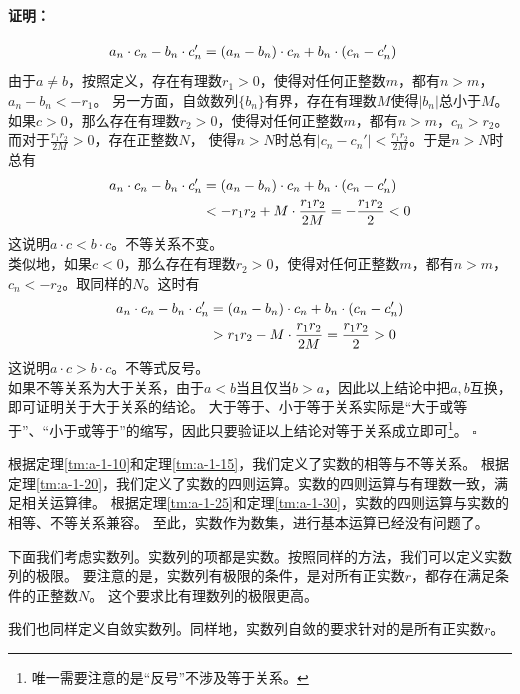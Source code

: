 \documentclass[12pt,UTF8]{ctexbook}
\renewenvironment{proof}{\paragraph{\textbf{证明：}}}{\hfill$\square$}
\begin{document}
\begin{appendix}
\begin{proof}
    \begin{align}
        a_n\cdot c_n - b_n\cdot c_n' &= (a_n - b_n)\cdot c_n + b_n\cdot(c_n - c_n') \notag 
    \end{align}
    由于$a\neq b$，按照定义，存在有理数$r_1>0$，使得对任何正整数$m$，都有$n>m$，$a_n - b_n < -r_1$。
    另一方面，自敛数列$\{b_n\}$有界，存在有理数$M$使得$|b_n|$总小于$M$。\\
    如果$c > 0$，那么存在有理数$r_2>0$，使得对任何正整数$m$，都有$n>m$，$c_n > r_2$。
    而对于$\frac{r_1r_2}{2M}>0$，存在正整数$N$，
    使得$n>N$时总有$|c_n - c_n'| < \frac{r_1r_2}{2M}$。于是$n>N$时总有
    \begin{align}
        a_n\cdot c_n - b_n\cdot c_n' &= (a_n - b_n)\cdot c_n + b_n\cdot(c_n - c_n') \notag \\
        &< -r_1r_2 + M\cdot\frac{r_1r_2}{2M} = -\frac{r_1r_2}{2} < 0 \notag
    \end{align}
    这说明$a\cdot c < b\cdot c$。不等关系不变。\\
    类似地，如果$c < 0$，那么存在有理数$r_2>0$，使得对任何正整数$m$，都有$n>m$，$c_n < -r_2$。取同样的$N$。这时有
    \begin{align}
        a_n\cdot c_n - b_n\cdot c_n' &= (a_n - b_n)\cdot c_n + b_n\cdot(c_n - c_n') \notag \\
        &> r_1r_2 - M\cdot\frac{r_1r_2}{2M} = \frac{r_1r_2}{2} > 0 \notag
    \end{align}
    这说明$a\cdot c > b\cdot c$。不等式反号。\\
    如果不等关系为大于关系，由于$a<b$当且仅当$b>a$，因此以上结论中把$a,b$互换，即可证明关于大于关系的结论。
    大于等于、小于等于关系实际是“大于或等于”、“小于或等于”的缩写，因此只要验证以上结论对等于关系成立即可\footnote{唯一需要注意的是“反号”不涉及等于关系。}。
\end{proof}

根据定理\ref{tm:a-1-10}和定理\ref{tm:a-1-15}，我们定义了实数的相等与不等关系。
根据定理\ref{tm:a-1-20}，我们定义了实数的四则运算。实数的四则运算与有理数一致，满足相关运算律。
根据定理\ref{tm:a-1-25}和定理\ref{tm:a-1-30}，实数的四则运算与实数的相等、不等关系兼容。
至此，实数作为数集，进行基本运算已经没有问题了。

下面我们考虑实数列。实数列的项都是实数。按照同样的方法，我们可以定义实数列的极限。
要注意的是，实数列有极限的条件，是对所有正实数$r$，都存在满足条件的正整数$N$。
这个要求比有理数列的极限更高。

我们也同样定义自敛实数列。同样地，实数列自敛的要求针对的是所有正实数$r$。


\end{appendix}
\end{document}
